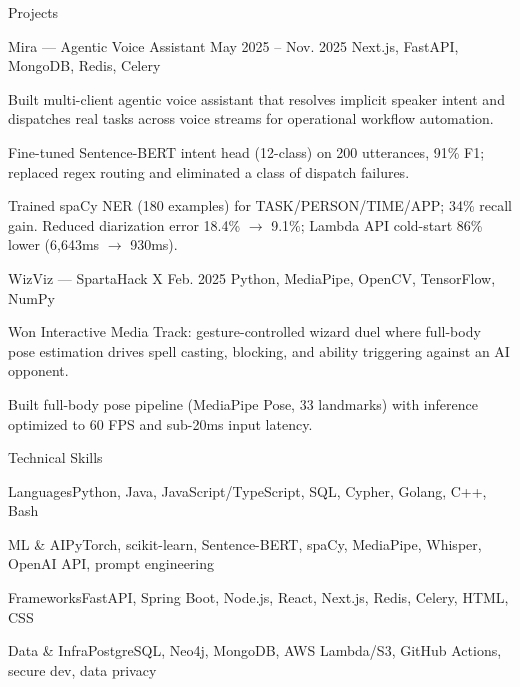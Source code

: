 \documentclass[
	11pt
]{../../../resume}
\begin{document}
	\begin{rSection}{P}{rojects}
		\begin{rSectionEntry}
			{Mira --- Agentic Voice Assistant}
			{May 2025 -- Nov. 2025}
			{}
			{Next.js, FastAPI, MongoDB, Redis, Celery}
			{}

			\item Built multi-client agentic voice assistant that resolves implicit speaker intent and dispatches real tasks across voice streams for operational workflow automation.
			\item Fine-tuned Sentence-BERT intent head (12-class) on 200 utterances, 91\% F1; replaced regex routing and eliminated a class of dispatch failures.
			\item Trained spaCy NER (180 examples) for TASK/PERSON/TIME/APP; 34\% recall gain. Reduced diarization error 18.4\% $\rightarrow$ 9.1\%; Lambda API cold-start 86\% lower (6{,}643ms $\rightarrow$ 930ms).
		\end{rSectionEntry}

		\begin{rSectionEntry}
			{WizViz --- SpartaHack X}
			{Feb. 2025}
			{}
			{Python, MediaPipe, OpenCV, TensorFlow, NumPy}
			{}

			\item Won Interactive Media Track: gesture-controlled wizard duel where full-body pose estimation drives spell casting, blocking, and ability triggering against an AI opponent.
			\item Built full-body pose pipeline (MediaPipe Pose, 33 landmarks) with inference optimized to 60 FPS and sub-20ms input latency.
		\end{rSectionEntry}
	\end{rSection}

	\begin{rSection}{T}{echnical Skills}
		\begin{rSet}{Languages}{Python, Java, JavaScript/TypeScript, SQL, Cypher, Golang, C++, Bash}
		\end{rSet}
		\begin{rSet}{ML \& AI}{PyTorch, scikit-learn, Sentence-BERT, spaCy, MediaPipe, Whisper, OpenAI API, prompt engineering}
		\end{rSet}
		\begin{rSet}{Frameworks}{FastAPI, Spring Boot, Node.js, React, Next.js, Redis, Celery, HTML, CSS}
		\end{rSet}
		\begin{rSet}{Data \& Infra}{PostgreSQL, Neo4j, MongoDB, AWS Lambda/S3, GitHub Actions, secure dev, data privacy}
		\end{rSet}
	\end{rSection}
\end{document}
